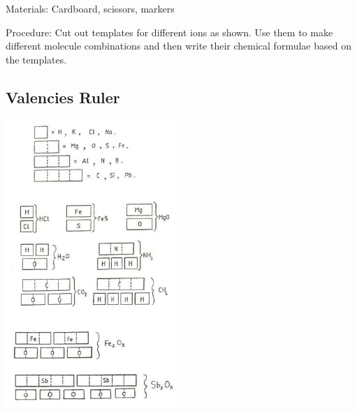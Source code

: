 \begin{multicols}{2}
\begin{description*}
\item[Materials:]{Cardboard, scissors, markers}
\item[Procedure:]{Cut out templates for different ions as shown. Use them to make different molecule combinations and then write their chemical formulae based on the templates.}
\end{description*}

\vfill
\columnbreak




\subsection{Valencies Ruler}

\begin{center}
\includegraphics[width=0.49\textwidth]{./img/source/valency-ruler.jpg}
\end{center}


\end{multicols}
